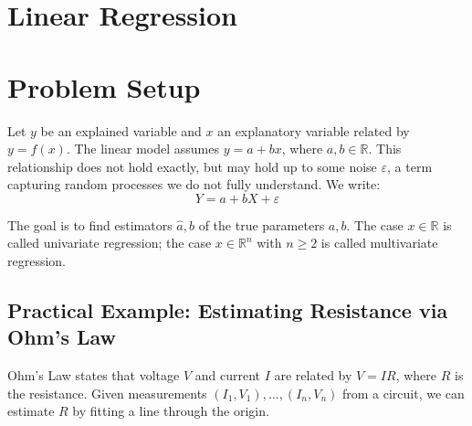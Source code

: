 \documentclass[main.tex]{subfiles}
\begin{document}
\section*{\Huge\textcolor{mantis}{Linear Regression}}
\vspace{0.5cm}

\needspace{0.33\textheight}
\section{Problem Setup}

Let $y$ be an explained variable and $x$ an explanatory variable related by $y = f(x)$. The linear model assumes $y = a + bx$, where $a, b \in \mathbb{R}$. This relationship does not hold exactly, but may hold up to some noise $\varepsilon$, a term capturing random processes we do not fully understand. We write:
$$Y = a + bX + \varepsilon$$

The goal is to find estimators $\hat{a}, \hat{b}$ of the true parameters $a, b$. The case $x \in \mathbb{R}$ is called univariate regression; the case $x \in \mathbb{R}^n$ with $n \geq 2$ is called multivariate regression.

\subsection{Practical Example: Estimating Resistance via Ohm's Law}

Ohm's Law states that voltage $V$ and current $I$ are related by $V = IR$, where $R$ is the resistance. Given measurements $(I_1, V_1), \ldots, (I_n, V_n)$ from a circuit, we can estimate $R$ by fitting a line through the origin.

\begin{center}
\end{center}
\end{document}
